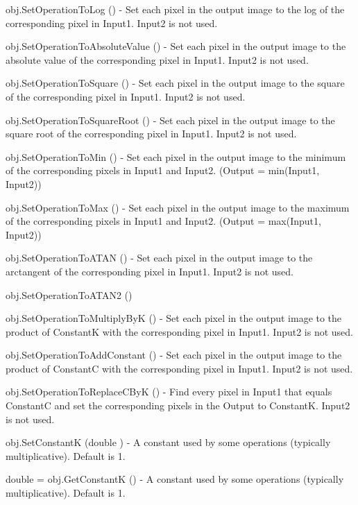 \begin{DoxyItemize}
\item {\ttfamily obj.\-Set\-Operation\-To\-Log ()} -\/ Set each pixel in the output image to the log of the corresponding pixel in Input1. Input2 is not used.  
\item {\ttfamily obj.\-Set\-Operation\-To\-Absolute\-Value ()} -\/ Set each pixel in the output image to the absolute value of the corresponding pixel in Input1. Input2 is not used.  
\item {\ttfamily obj.\-Set\-Operation\-To\-Square ()} -\/ Set each pixel in the output image to the square of the corresponding pixel in Input1. Input2 is not used.  
\item {\ttfamily obj.\-Set\-Operation\-To\-Square\-Root ()} -\/ Set each pixel in the output image to the square root of the corresponding pixel in Input1. Input2 is not used.  
\item {\ttfamily obj.\-Set\-Operation\-To\-Min ()} -\/ Set each pixel in the output image to the minimum of the corresponding pixels in Input1 and Input2. (Output = min(\-Input1, Input2))  
\item {\ttfamily obj.\-Set\-Operation\-To\-Max ()} -\/ Set each pixel in the output image to the maximum of the corresponding pixels in Input1 and Input2. (Output = max(\-Input1, Input2))  
\item {\ttfamily obj.\-Set\-Operation\-To\-A\-T\-A\-N ()} -\/ Set each pixel in the output image to the arctangent of the corresponding pixel in Input1. Input2 is not used.  
\item {\ttfamily obj.\-Set\-Operation\-To\-A\-T\-A\-N2 ()}  
\item {\ttfamily obj.\-Set\-Operation\-To\-Multiply\-By\-K ()} -\/ Set each pixel in the output image to the product of Constant\-K with the corresponding pixel in Input1. Input2 is not used.  
\item {\ttfamily obj.\-Set\-Operation\-To\-Add\-Constant ()} -\/ Set each pixel in the output image to the product of Constant\-C with the corresponding pixel in Input1. Input2 is not used.  
\item {\ttfamily obj.\-Set\-Operation\-To\-Replace\-C\-By\-K ()} -\/ Find every pixel in Input1 that equals Constant\-C and set the corresponding pixels in the Output to Constant\-K. Input2 is not used.  
\item {\ttfamily obj.\-Set\-Constant\-K (double )} -\/ A constant used by some operations (typically multiplicative). Default is 1.  
\item {\ttfamily double = obj.\-Get\-Constant\-K ()} -\/ A constant used by some operations (typically multiplicative). Default is 1.  

\end{DoxyItemize}

